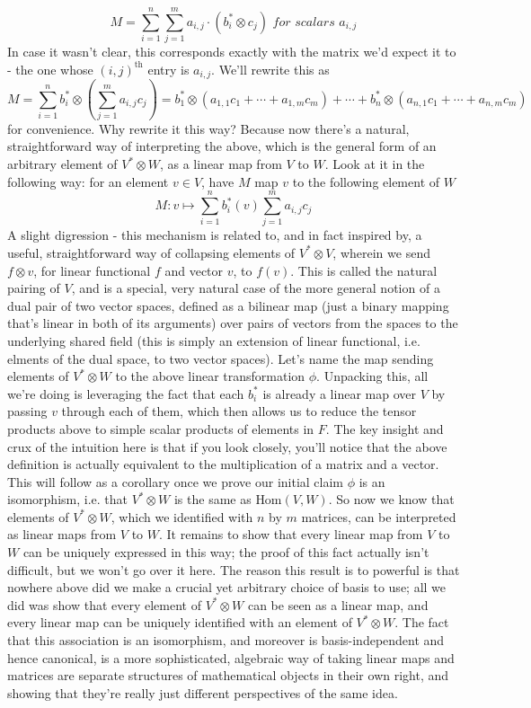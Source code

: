 \documentclass{article}
\newcommand{\nn}{\leavevmode \newline \newline}
\newcommand{\Hom}{\text{Hom}}
\begin{document}
\begin{adjustwidth}{1cm}{1cm}
		$$ M = \sum_{i = 1}^n \sum_{j = 1}^m a_{i, j} \cdot (b_i^* \otimes c_j) \textit{ for scalars } a_{i, j} $$
	In case it wasn't clear, this corresponds exactly with the matrix we'd expect it to - the one whose $ (i, j)^\text{th} $ entry is $ a_{i, j} $. We'll rewrite this as
		$$ M = \sum_{i = 1}^n b_i^* \otimes \left( \sum_{j = 1}^m a_{i, j} c_j \right) = b_1^* \otimes (a_{1, 1} c_1 + \cdots + a_{1, m} c_m) + \cdots + b_n^* \otimes (a_{n, 1} c_1 + \cdots + a_{n, m} c_m) $$
	for convenience. Why rewrite it this way? Because now there's a natural, straightforward way of interpreting the above, which is the general form of an arbitrary element of $ V^* \otimes W $, as a linear map from $ V $ to $ W $. Look at it in the following way: for an element $ v \in V $, have $ M $ map $ v $ to the following element of $ W $
            $$ M: v \mapsto \sum_{i = 1}^n b_i^*(v) \sum_{j = 1}^m a_{i, j} c_j $$
        A slight digression - this mechanism is related to, and in fact inspired by, a useful, straightforward way of collapsing elements of $ V^* \otimes V $, wherein we send $ f \otimes v $, for linear functional $ f $ and vector $ v $, to $ f(v) $. This is called the natural pairing of $ V $, and is a special, very natural case of the more general notion of a dual pair of two vector spaces, defined as a bilinear map (just a binary mapping that's linear in both of its arguments) over pairs of vectors from the spaces to the underlying shared field (this is simply an extension of linear functional, i.e. elments of the dual space, to two vector spaces).
        \nn
        Let's name the map sending elements of $ V^* \otimes W $ to the above linear transformation $ \phi $. Unpacking this, all we're doing is leveraging the fact that each $ b_i^* $ is already a linear map over $ V $ by passing $ v $ through each of them, which then allows us to reduce the tensor products above to simple scalar products of elements in $ F $. The key insight and crux of the intuition here is that if you look closely, you'll notice that the above definition is actually equivalent to the multiplication of a matrix and a vector. This will follow as a corollary once we prove our initial claim $ \phi $ is an isomorphism, i.e. that $ V^* \otimes W $ is the same as $ \Hom(V, W) $. So now we know that elements of $ V^* \otimes W $, which we identified with $ n $ by $ m $ matrices, can be interpreted as linear maps from $ V $ to $ W $. It remains to show that every linear map from $ V $ to $ W $ can be uniquely expressed in this way; the proof of this fact actually isn't difficult, but we won't go over it here. The reason this result is to powerful is that nowhere above did we make a crucial yet arbitrary choice of basis to use; all we did was show that every element of $ V^* \otimes W $ can be seen as a linear map, and every linear map can be uniquely identified with an element of $ V^* \otimes W $. The fact that this association is an isomorphism, and moreover is basis-independent and hence canonical, is a more sophisticated, algebraic way of taking linear maps and matrices are separate structures of mathematical objects in their own right, and showing that they're really just different perspectives of the same idea.

\end{adjustwidth}
\end{document}
